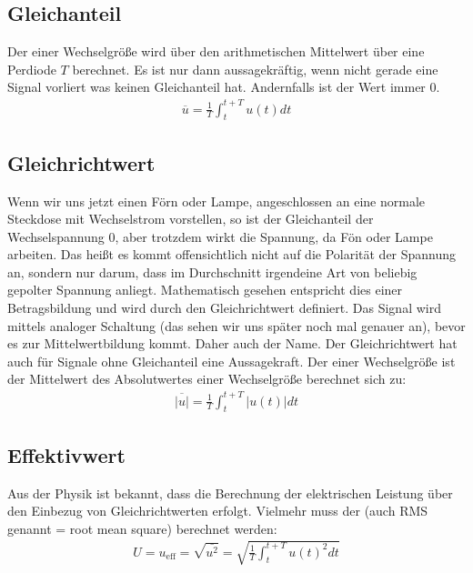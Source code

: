 \documentclass[letterpaper,10pt,english]{jupyterBook}
\begin{document}
\subsection{Gleichanteil}
\label{\detokenize{content/3_Kenngroessen:gleichanteil}}
\sphinxAtStartPar
Der  einer Wechselgröße wird über den arithmetischen Mittelwert über eine Perdiode \(T\) berechnet. Es ist nur dann aussagekräftig, wenn nicht gerade eine Signal vorliert was keinen Gleichanteil hat. Andernfalls ist der Wert immer 0.
\begin{equation*}
\begin{split}\overline u = \frac{1}{T}\int_{t}^{t+T} u(t)dt\end{split}
\end{equation*}

\subsection{Gleichrichtwert}
\label{\detokenize{content/3_Kenngroessen:gleichrichtwert}}
\sphinxAtStartPar
Wenn wir uns jetzt einen Förn oder Lampe, angeschlossen an eine normale Steckdose mit Wechselstrom vorstellen, so ist der Gleichanteil der Wechselspannung 0, aber trotzdem wirkt die Spannung, da Fön oder Lampe arbeiten. Das heißt es kommt offensichtlich nicht auf die Polarität der Spannung an, sondern nur darum, dass im Durchschnitt irgendeine Art von beliebig gepolter Spannung anliegt. Mathematisch gesehen entspricht dies einer Betragsbildung und wird durch den Gleichrichtwert definiert.  Das Signal wird mittels analoger Schaltung  (das sehen wir uns später noch mal genauer an), bevor es zur Mittelwertbildung kommt. Daher auch der Name. Der Gleichrichtwert hat auch für Signale ohne Gleichanteil eine Aussagekraft. Der  einer Wechselgröße ist der Mittelwert des Absolutwertes einer Wechselgröße berechnet sich zu:
\begin{equation*}
\begin{split}\overline{|u|} = \frac{1}{T}\int_{t}^{t+T} |u(t)|dt\end{split}
\end{equation*}

\subsection{Effektivwert}
\label{\detokenize{content/3_Kenngroessen:effektivwert}}
\sphinxAtStartPar
Aus der Physik ist bekannt, dass die Berechnung der elektrischen Leistung  über den Einbezug von Gleichrichtwerten erfolgt. Vielmehr muss der  (auch RMS genannt = root mean square) berechnet werden:
\begin{equation*}
\begin{split}U = u_\mathrm{eff} = \sqrt{\overline{u^2}} = \sqrt{\frac{1}{T}\int_{t}^{t+T}u(t)^2dt}\end{split}
\end{equation*}
\end{document}
